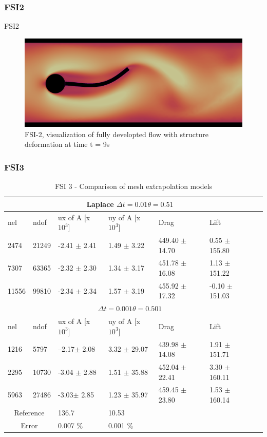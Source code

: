 \subsubsection{FSI2}
FSI2
\begin{figure}[h!]
  \centering
    \includegraphics[scale=0.2]{./Fig/fsi2flow.png}
      \caption{FSI-2, visualization of fully developted flow with structure deformation at time t = 9s}
\end{figure}

\newpage
\subsubsection{FSI3}

\begin{table}[h!]
\centering
\caption{FSI 3 - Comparison of mesh extrapolation models}
\label{my-label}
\begin{tabular}{ |p{1cm}||p{1cm}|p{2.5cm}|p{2.5cm}|p{2.7cm}|p{2.7cm}|p{1.2cm}|}
 \hline
  \multicolumn{6}{|c|}{Laplace \hspace{2mm} $\Delta t = 0.01 \theta = 0.51$} \\
   \hline
nel & ndof & ux of A [x $10^{3}$]  &uy of A [x $10^{3}$]& Drag  & Lift \\
 \hline
 2474    & 21249  & -2.41      $\pm$ 2.41 & 1.49       $\pm$ 3.22 & 449.40       $\pm$ 14.70 & 0.55       $\pm$ 155.80  \\
 7307    & 63365  & -2.32       $\pm$ 2.30 & 1.34       $\pm$ 3.17 & 451.78       $\pm$ 16.08 & 1.13       $\pm$ 151.22  \\
 11556   & 99810  & -2.34       $\pm$ 2.34 & 1.57       $\pm$ 3.19 & 455.92       $\pm$ 17.32 & -0.10       $\pm$ 151.03 \\
 \hline
  \multicolumn{6}{|c|}{$\Delta t = 0.001 \theta = 0.501$} \\
   \hline
 nel & ndof & ux of A [x $10^{3}$]  &uy of A [x $10^{3}$]& Drag  & Lift \\
    \hline
1216 &5797& --2.17$\pm$  2.08 &     3.32     $\pm$  29.07 &439.98 $\pm$  14.08  &  1.91 $\pm$  151.71\\
2295 &10730& -3.04 $\pm$  2.88 &  1.51  $\pm$  35.88 & 452.04  $\pm$  22.41 &  3.30      $\pm$  160.11 \\
5963 &27486 & -3.03$\pm$  2.85 &  1.23 $\pm$  35.97  & 459.45  $\pm$  23.80 &  1.53  $\pm$  160.14 \\
 \hline
  \multicolumn{2}{|c|}{Reference}  & 136.7   & 10.53 & &\\
   \hline
    \multicolumn{2}{|c|}{Error}  & 0.007 \%   & 0.001 \% & &\\
   \hline
\end{tabular}
\end{table}

